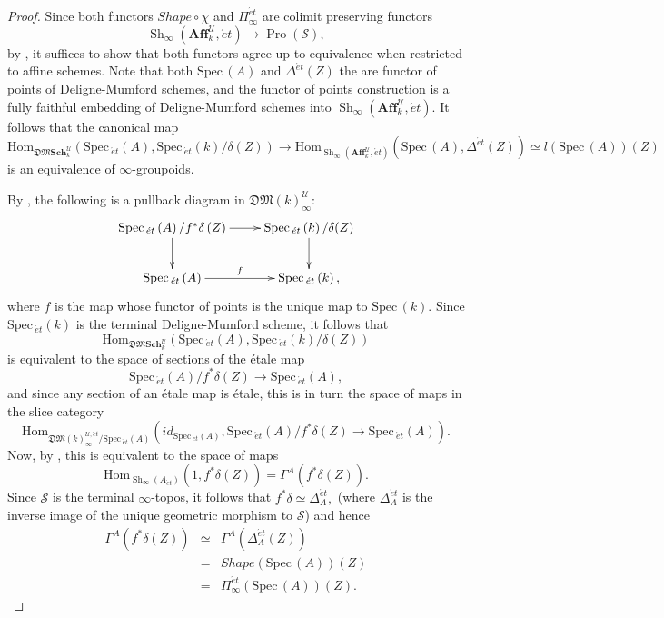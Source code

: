 \documentclass[12pt]{amsart}
\theoremstyle{definition}
\newcommand{\cS}{\mathcal{S}}
\newcommand{\cU}{\mathcal{U}}
\newcommand{\Affku}{\mathbf{Aff}^{\cU}_{k}}
\newcommand{\Spec}{\mathrm{Spec}\,}
\newcommand{\Sh}{\operatorname{Sh}}
\newcommand{\Hom}{\mathrm{Hom}}
\newcommand{\et}{\acute{e}t}
\def\Sch{\mathbf{Sch}}
\renewcommand{\i}{\infty}
\def\Pro{\operatorname{Pro}}
\def\Shi{\Sh_\i}
\def\Shape{\mathit{Shape}}
\def\Dmsch{\mathfrak{DM}\Sch^\cU_k}
\begin{document}
\begin{proof}
Since both functors $\Shape \circ \chi$ and $\Pi^{\et}_\i$ are colimit preserving functors $$\Shi\left(\Affku,\et\right) \to \Pro\left(\cS\right),$$ by \cite[Proposition 5.5.4.20 and Theorem 5.1.5.6]{htt}, it suffices to show that both functors agree up to equivalence when restricted to affine schemes. Note that both $\Spec\left(A\right)$ and $\Delta^{\et}\left(Z\right)$ the are functor of points of Deligne-Mumford schemes, and the functor of points construction is a fully faithful embedding of Deligne-Mumford schemes into $\Shi\left(\Affku,\et\right).$ It follows that the canonical map $$\Hom_{\Dmsch}\left(\Spec_{\et}\left(A\right),\Spec_{\et}\left(k\right)/\delta\left(Z\right)\right) \to \Hom_{\Shi\left(\Affku,\et\right)}\left(\Spec\left(A\right),\Delta^{\et}\left(Z\right)\right)\simeq l\left(\Spec\left(A\right)\right)\left(Z\right)$$ is an equivalence of $\i$-groupoids.

By \cite[Remark 2.3.20]{dagv}, the following is a pullback diagram in $\mathfrak{DM}\left(k\right)_\i^{\cU}$:
$$\xymatrix{\Spec_{\et}\left(A\right)/f^*\delta\left(Z\right) \ar[r] \ar[d] & \Spec_{\et}\left(k\right)/\delta(Z)\ar[d]\\
\Spec_{\et}\left(A\right) \ar[r]^-{f} & \Spec_{\et}\left(k\right),}$$ where $f$ is the map whose functor of points is the unique map to $\Spec\left(k\right).$
Since $\Spec_{\et}\left(k\right)$ is the terminal Deligne-Mumford scheme, it follows that $$\Hom_{\Dmsch}\left(\Spec_{\et}\left(A\right),\Spec_{\et}\left(k\right)/\delta\left(Z\right)\right)$$ is equivalent to the space of sections of the \'etale map  $$\Spec_{\et}\left(A\right)/f^*\delta\left(Z\right) \to \Spec_{\et}\left(A\right),$$ and since any section of an \'etale map is \'etale, this is in turn the space of maps in the slice category $$\Hom_{\mathfrak{DM}\left(k\right)_\i^{\cU,\et}/\Spec_{\et}\left(A\right)}\left(id_{\Spec_{\et}\left(A\right)},\Spec_{\et}\left(A\right)/f^*\delta\left(Z\right) \to \Spec_{\et}\left(A\right)\right).$$ Now, by \cite[Proposition 2.3.5]{dagv}, this is equivalent to the space of maps $$\Hom_{\Shi\left(A_{\et}\right)}\left(1,f^*\delta\left(Z\right)\right)=\Gamma^A\left(f^*\delta\left(Z\right)\right).$$ Since $\cS$ is the terminal $\i$-topos, it follows that $f^*\delta\simeq\Delta^{\et}_A,$ (where $\Delta^{\et}_A$ is the inverse image of the unique geometric morphism to $\cS$) and hence 
\begin{eqnarray*}
\Gamma^A\left(f^*\delta\left(Z\right)\right)&\simeq& \Gamma^A\left(\Delta^{\et}_A\left(Z\right)\right)\\
&=&\Shape\left(\Spec\left(A\right)\right)\left(Z\right)\\
&=& \Pi^{\et}_\i\left(\Spec\left(A\right)\right)\left(Z\right).
\end{eqnarray*}




\end{proof}
\end{document}
